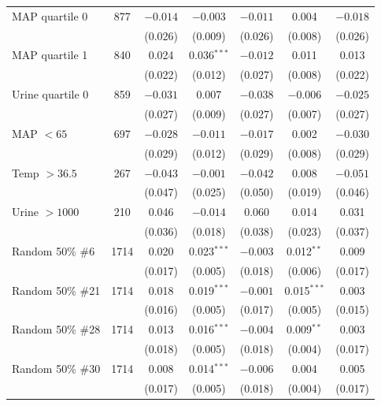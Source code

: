 \begin{table}[H]
\begin{tabular}{@{}lc*{5}{c}@{}}
    MAP quartile 0 & 877 & $-0.014$ & $-0.003$ & $-0.011$ & 0.004 & $-0.018$ \\
    & & (0.026) & (0.009) & (0.026) & (0.008) & (0.026) \\[0.3em]
    
    MAP quartile 1 & 840 & 0.024 & 0.036$^{***}$ & $-0.012$ & 0.011 & 0.013 \\
    & & (0.022) & (0.012) & (0.027) & (0.008) & (0.022) \\[0.3em]
    
    Urine quartile 0 & 859 & $-0.031$ & 0.007 & $-0.038$ & $-0.006$ & $-0.025$ \\
    & & (0.027) & (0.009) & (0.027) & (0.007) & (0.027) \\[0.3em]
    
    MAP $< 65$ & 697 & $-0.028$ & $-0.011$ & $-0.017$ & 0.002 & $-0.030$ \\
    & & (0.029) & (0.012) & (0.029) & (0.008) & (0.029) \\[0.3em]
    
    Temp $> 36.5$ & 267 & $-0.043$ & $-0.001$ & $-0.042$ & 0.008 & $-0.051$ \\
    & & (0.047) & (0.025) & (0.050) & (0.019) & (0.046) \\[0.3em]
    
    Urine $> 1000$ & 210 & 0.046 & $-0.014$ & 0.060 & 0.014 & 0.031 \\
    & & (0.036) & (0.018) & (0.038) & (0.023) & (0.037) \\[0.3em]
    
    Random 50\% \#6 & 1714 & 0.020 & 0.023$^{***}$ & $-0.003$ & 0.012$^{**}$ & 0.009 \\
    & & (0.017) & (0.005) & (0.018) & (0.006) & (0.017) \\[0.3em]

    Random 50\% \#21 & 1714 & 0.018 & 0.019$^{***}$ & $-0.001$ & 0.015$^{***}$ & 0.003 \\
    & & (0.016) & (0.005) & (0.017) & (0.005) & (0.015) \\[0.3em]

    Random 50\% \#28 & 1714 & 0.013 & 0.016$^{***}$ & $-0.004$ & 0.009$^{**}$ & 0.003 \\
    & & (0.018) & (0.005) & (0.018) & (0.004) & (0.017) \\[0.3em]

    Random 50\% \#30 & 1714 & 0.008 & 0.014$^{***}$ & $-0.006$ & 0.004 & 0.005 \\
    & & (0.017) & (0.005) & (0.018) & (0.004) & (0.017) \\[0.3em]


\end{tabular}
\end{table}
